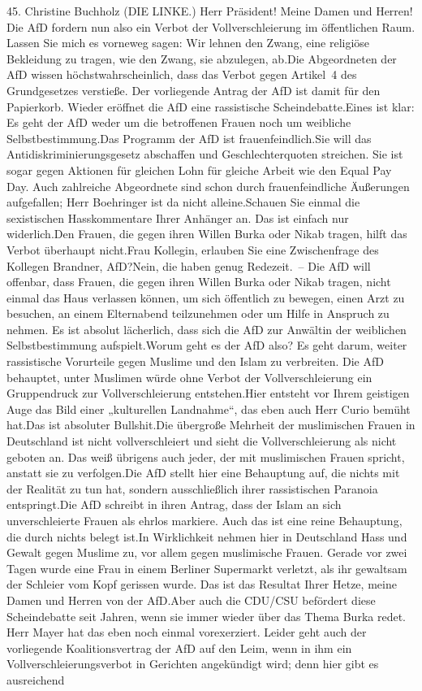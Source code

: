\documentclass{article}
\begin{document}
	45. Christine Buchholz (DIE LINKE.) Herr Präsident! Meine Damen und Herren! Die AfD fordern nun also ein Verbot der Vollverschleierung im öffentlichen Raum. Lassen Sie mich es vorneweg sagen: Wir lehnen den Zwang, eine religiöse Bekleidung zu tragen, wie den Zwang, sie abzulegen, ab.Die Abgeordneten der AfD wissen höchstwahrscheinlich, dass das Verbot gegen Artikel 4 des Grundgesetzes verstieße. Der vorliegende Antrag der AfD ist damit für den Papierkorb. Wieder eröffnet die AfD eine rassistische Scheindebatte.Eines ist klar: Es geht der AfD weder um die betroffenen Frauen noch um weibliche Selbstbestimmung.Das Programm der AfD ist frauenfeindlich.Sie will das Antidiskriminierungsgesetz abschaffen und Geschlechterquoten streichen. Sie ist sogar gegen Aktionen für gleichen Lohn für gleiche Arbeit wie den Equal Pay Day. Auch zahlreiche Abgeordnete sind schon durch frauenfeindliche Äußerungen aufgefallen; Herr Boehringer ist da nicht alleine.Schauen Sie einmal die sexistischen Hasskommentare Ihrer Anhänger an. Das ist einfach nur widerlich.Den Frauen, die gegen ihren Willen Burka oder Nikab tragen, hilft das Verbot überhaupt nicht.Frau Kollegin, erlauben Sie eine Zwischenfrage des Kollegen Brandner, AfD?Nein, die haben genug Redezeit. – Die AfD will offenbar, dass Frauen, die gegen ihren Willen Burka oder Nikab tragen, nicht einmal das Haus verlassen können, um sich öffentlich zu bewegen, einen Arzt zu besuchen, an einem Elternabend teilzunehmen oder um Hilfe in Anspruch zu nehmen. Es ist absolut lächerlich, dass sich die AfD zur Anwältin der weiblichen Selbstbestimmung aufspielt.Worum geht es der AfD also? Es geht darum, weiter rassistische Vorurteile gegen Muslime und den Islam zu verbreiten. Die AfD behauptet, unter Muslimen würde ohne Verbot der Vollverschleierung ein Gruppendruck zur Vollverschleierung entstehen.Hier entsteht vor Ihrem geistigen Auge das Bild einer „kulturellen Landnahme“, das eben auch Herr Curio bemüht hat.Das ist absoluter Bullshit.Die übergroße Mehrheit der muslimischen Frauen in Deutschland ist nicht vollverschleiert und sieht die Vollverschleierung als nicht geboten an. Das weiß übrigens auch jeder, der mit muslimischen Frauen spricht, anstatt sie zu verfolgen.Die AfD stellt hier eine Behauptung auf, die nichts mit der Realität zu tun hat, sondern ausschließlich ihrer rassistischen Paranoia entspringt.Die AfD schreibt in ihren Antrag, dass der Islam an sich unverschleierte Frauen als ehrlos markiere. Auch das ist eine reine Behauptung, die durch nichts belegt ist.In Wirklichkeit nehmen hier in Deutschland Hass und Gewalt gegen Muslime zu, vor allem gegen muslimische Frauen. Gerade vor zwei Tagen wurde eine Frau in einem Berliner Supermarkt verletzt, als ihr gewaltsam der Schleier vom Kopf gerissen wurde. Das ist das Resultat Ihrer Hetze, meine Damen und Herren von der AfD.Aber auch die CDU/CSU befördert diese Scheindebatte seit Jahren, wenn sie immer wieder über das Thema Burka redet. Herr Mayer hat das eben noch einmal vorexerziert. Leider geht auch der vorliegende Koalitionsvertrag der AfD auf den Leim, wenn in ihm ein Vollverschleierungsverbot in Gerichten angekündigt wird; denn hier gibt es ausreichend 
\end{document}
